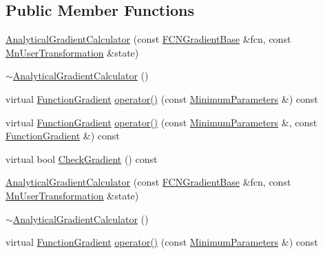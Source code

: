 \subsection*{Public Member Functions}
\begin{DoxyCompactItemize}
\item 
\mbox{\hyperlink{classROOT_1_1Minuit2_1_1AnalyticalGradientCalculator_a7cd3bd0ee00315f4e67cf4ad2a96790e}{Analytical\+Gradient\+Calculator}} (const \mbox{\hyperlink{classROOT_1_1Minuit2_1_1FCNGradientBase}{F\+C\+N\+Gradient\+Base}} \&fcn, const \mbox{\hyperlink{classROOT_1_1Minuit2_1_1MnUserTransformation}{Mn\+User\+Transformation}} \&state)
\item 
\mbox{\hyperlink{classROOT_1_1Minuit2_1_1AnalyticalGradientCalculator_a18d82365bea770691dae6f3b44d19ed4}{$\sim$\+Analytical\+Gradient\+Calculator}} ()
\item 
virtual \mbox{\hyperlink{classROOT_1_1Minuit2_1_1FunctionGradient}{Function\+Gradient}} \mbox{\hyperlink{classROOT_1_1Minuit2_1_1AnalyticalGradientCalculator_aff4787568d15aaf6dac1c8ffa1bd9db7}{operator()}} (const \mbox{\hyperlink{classROOT_1_1Minuit2_1_1MinimumParameters}{Minimum\+Parameters}} \&) const
\item 
virtual \mbox{\hyperlink{classROOT_1_1Minuit2_1_1FunctionGradient}{Function\+Gradient}} \mbox{\hyperlink{classROOT_1_1Minuit2_1_1AnalyticalGradientCalculator_ad16442d24717c36e7d32897a2f8951c0}{operator()}} (const \mbox{\hyperlink{classROOT_1_1Minuit2_1_1MinimumParameters}{Minimum\+Parameters}} \&, const \mbox{\hyperlink{classROOT_1_1Minuit2_1_1FunctionGradient}{Function\+Gradient}} \&) const
\item 
virtual bool \mbox{\hyperlink{classROOT_1_1Minuit2_1_1AnalyticalGradientCalculator_adee37f46da7ed30710a050462c0aa6f0}{Check\+Gradient}} () const
\item 
\mbox{\hyperlink{classROOT_1_1Minuit2_1_1AnalyticalGradientCalculator_a7cd3bd0ee00315f4e67cf4ad2a96790e}{Analytical\+Gradient\+Calculator}} (const \mbox{\hyperlink{classROOT_1_1Minuit2_1_1FCNGradientBase}{F\+C\+N\+Gradient\+Base}} \&fcn, const \mbox{\hyperlink{classROOT_1_1Minuit2_1_1MnUserTransformation}{Mn\+User\+Transformation}} \&state)
\item 
\mbox{\hyperlink{classROOT_1_1Minuit2_1_1AnalyticalGradientCalculator_a18d82365bea770691dae6f3b44d19ed4}{$\sim$\+Analytical\+Gradient\+Calculator}} ()
\item 
virtual \mbox{\hyperlink{classROOT_1_1Minuit2_1_1FunctionGradient}{Function\+Gradient}} \mbox{\hyperlink{classROOT_1_1Minuit2_1_1AnalyticalGradientCalculator_a711ef74b01726ca7081031998c44d81b}{operator()}} (const \mbox{\hyperlink{classROOT_1_1Minuit2_1_1MinimumParameters}{Minimum\+Parameters}} \&) const

\end{DoxyCompactItemize}
